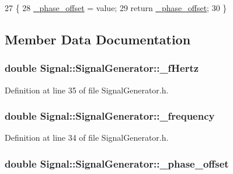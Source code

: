 \begin{DoxyCode}
27                                                                    \{
28     \hyperlink{classSignal_1_1SignalGenerator_a6b4444d46747c8517171edbbf4b5588f}{\_phase\_offset} = value;
29     \textcolor{keywordflow}{return} \hyperlink{classSignal_1_1SignalGenerator_a6b4444d46747c8517171edbbf4b5588f}{\_phase\_offset};
30 \}
\end{DoxyCode}


\subsection{Member Data Documentation}
\hypertarget{classSignal_1_1SignalGenerator_a85a4702347352bab1c71e0a8df8437d6}{
\subsubsection[{\+\_\+f\+Hertz}]{\setlength{\rightskip}{0pt plus 5cm}double Signal\+::\+Signal\+Generator\+::\+\_\+f\+Hertz\hspace{0.3cm}{\ttfamily [protected]}}}\label{classSignal_1_1SignalGenerator_a85a4702347352bab1c71e0a8df8437d6}


Definition at line 35 of file Signal\+Generator.\+h.

\hypertarget{classSignal_1_1SignalGenerator_a7f107461333bce68c5dad412db96a8c2}{
\subsubsection[{\+\_\+frequency}]{\setlength{\rightskip}{0pt plus 5cm}double Signal\+::\+Signal\+Generator\+::\+\_\+frequency\hspace{0.3cm}{\ttfamily [protected]}}}\label{classSignal_1_1SignalGenerator_a7f107461333bce68c5dad412db96a8c2}


Definition at line 34 of file Signal\+Generator.\+h.

\hypertarget{classSignal_1_1SignalGenerator_a6b4444d46747c8517171edbbf4b5588f}{
\subsubsection[{\+\_\+phase\+\_\+offset}]{\setlength{\rightskip}{0pt plus 5cm}double Signal\+::\+Signal\+Generator\+::\+\_\+phase\+\_\+offset\hspace{0.3cm}{\ttfamily [protected]}}}\label{classSignal_1_1SignalGenerator_a6b4444d46747c8517171edbbf4b5588f}


